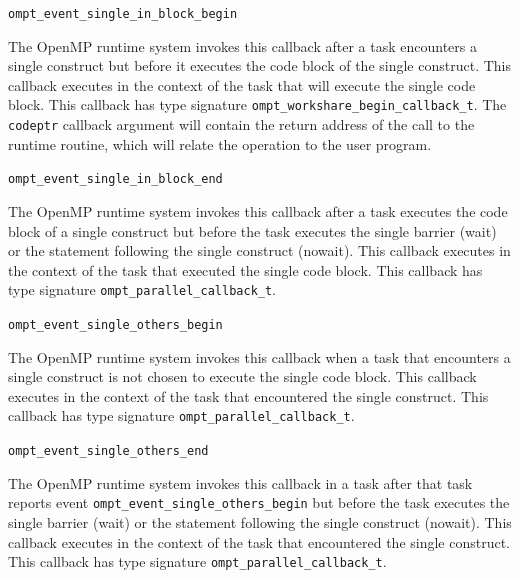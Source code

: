 \documentclass{article}
\newcommand{\descheader}[1]{{\needspace{3\baselineskip}\vspace{1em}\noindent \fbox{#1}}}
\begin{document}
\descheader{Single Blocks}

\begin{description}

\item \verb|ompt_event_single_in_block_begin|
 
  The OpenMP runtime system invokes this callback after a task encounters a single construct but before it executes the code block of the single construct. This callback
  executes in the context of the task that will execute the single code block. %
  This callback has type signature \verb|ompt_workshare_begin_callback_t|. 
  The \verb|codeptr| callback argument will contain the return address of the call to the runtime routine, which will relate the operation to the user program.

\item \verb|ompt_event_single_in_block_end|
 
  The OpenMP runtime system invokes this callback after a task
  executes the code block of a single construct but before the
  task executes the single barrier (wait) or the statement
  following the single construct (nowait). This callback executes in
  the context of the task that executed the single code block.
  This callback has type signature \verb|ompt_parallel_callback_t|. 

\item \verb|ompt_event_single_others_begin|
 
  The OpenMP runtime system invokes this callback when 
  a task that encounters a single construct is not chosen to execute the single code block.
  This callback executes in the context of the task that encountered the single construct.
  This callback has type signature \verb|ompt_parallel_callback_t|. 

\item \verb|ompt_event_single_others_end|

 \sloppy
  The OpenMP runtime system invokes this callback in a task after that task reports event
  \verb|ompt_event_single_others_begin| but before the task
  executes the
  single barrier (wait) or the statement following the single
  construct (nowait). This callback executes in the context of the
  task that encountered the single construct.
  This callback has type signature \verb|ompt_parallel_callback_t|. 

\end{description}
\end{document}
